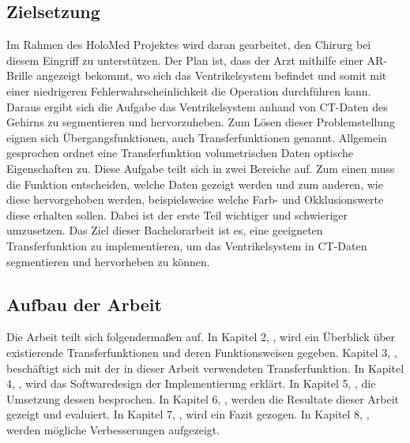 \subsection{Zielsetzung}

Im Rahmen des HoloMed Projektes wird daran gearbeitet, den Chirurg bei diesem Eingriff zu unterstützen. Der Plan ist, dass der Arzt mithilfe einer AR-Brille angezeigt bekommt, wo sich das Ventrikelsystem befindet und somit mit einer niedrigeren Fehlerwahrscheinlichkeit die Operation durchführen kann. Daraus ergibt sich die Aufgabe das Ventrikelsystem anhand von CT-Daten des Gehirns zu segmentieren und hervorzuheben.
\newline
Zum Lösen dieser Problemstellung eignen sich Übergangsfunktionen, auch Transferfunktionen genannt. Allgemein gesprochen ordnet eine Transferfunktion volumetrischen Daten optische Eigenschaften zu. Diese Aufgabe teilt sich in zwei Bereiche auf. Zum einen muss die Funktion entscheiden, welche Daten gezeigt werden und zum anderen, wie diese hervorgehoben werden, beispielsweise welche Farb- und Okklusionswerte diese erhalten sollen. Dabei ist der erste Teil wichtiger und schwieriger umzusetzen.
\newline
Das Ziel dieser Bachelorarbeit ist es, eine geeigneten Transferfunktion zu implementieren, um das Ventrikelsystem in CT-Daten segmentieren und hervorheben zu können.



\subsection{Aufbau der Arbeit}

Die Arbeit teilt sich folgendermaßen auf.
In Kapitel 2, , wird ein Überblick über existierende Transferfunktionen und deren Funktionsweisen gegeben.
Kapitel 3, , beschäftigt sich mit der in dieser Arbeit verwendeten Transferfunktion.
In Kapitel 4, , wird das Softwaredesign der Implementierung erklärt.
In Kapitel 5, , die Umsetzung dessen besprochen.
In Kapitel 6, , werden die Resultate dieser Arbeit gezeigt und evaluiert.
In Kapitel 7, , wird ein Fazit gezogen.
In Kapitel 8, , werden mögliche Verbesserungen aufgezeigt.